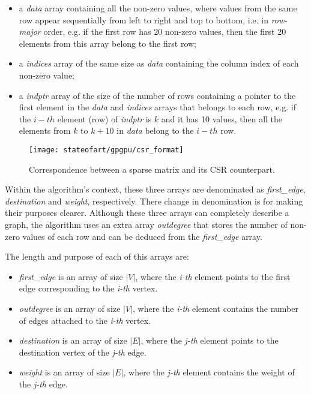 \begin{itemize}
	\item a \emph{data} array containing all the non-zero values, where values from the same row appear sequentially from left to right and top to bottom, i.e. in \emph{row-major} order, e.g. if the first row has 20 non-zero values, then the first 20 elements from this array belong to the first row;
	\item a \emph{indices} array of the same size as \emph{data} containing the column index of each non-zero value;
	\item a \emph{indptr} array of the size of the number of rows containing a pointer to the first element in the \emph{data} and \emph{indices} arrays that belongs to each row, e.g. if the $i-th$ element (row) of \emph{indptr} is $k$ and it has 10 values, then all the elements from $k$ to $k + 10$ in \emph{data} belong to the $i-th$ row.
\end{itemize}

\begin{figure}[hbtp]
\centering
\texttt{[image: stateofart/gpgpu/csr\_format]}
\caption{Correspondence between a sparse matrix and its CSR counterpart.}
\label{fig:csr}
\end{figure}

Within the algorithm's context, these three arrays are denominated as \emph{first\_edge}, \emph{destination} and \emph{weight}, respectively.
There change in denomination is for making their purposes clearer.
Although these three arrays can completely describe a graph, the algorithm uses an extra array \emph{outdegree} that stores the number of non-zero values of each row and can be deduced from the \emph{first\_edge} array.

The length and purpose of each of this arrays are:
\begin{itemize}
	\item \emph{first\_edge} is an array of size $|V|$, where the \emph{i-th} element points to the first edge corresponding to the \emph{i-th} vertex.
	\item \emph{outdegree} is an array of size $|V|$, where the \emph{i-th} element contains the number of edges attached to the \emph{i-th} vertex.
	\item \emph{destination} is an array of size $|E|$, where the \emph{j-th} element points to the destination vertex of the \emph{j-th} edge.
	\item \emph{weight} is an array of size $|E|$, where the \emph{j-th} element contains the weight of the \emph{j-th} edge.
\end{itemize}

